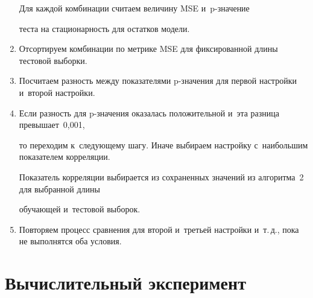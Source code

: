 \begin{multicols}{2}
\begin{enumerate}[1.]
        Для каждой комбинации считаем величину MSE и~p-зна\-че\-ние 

        теста на ста\-ци\-о\-нар\-ность для остатков модели.



        

        

        \item



        Отсортируем комбинации по метрике MSE для фиксированной длины тес\-то\-вой выборки.



        \item



        Посчитаем разность между показателями \mbox{p-зна}\-че\-ния для первой настройки и~второй настройки.



        

        \item



        Если разность для p-зна\-че\-ния оказалась положительной и~эта разница превышает~0,001, 

        то переходим к~следующему шагу. Иначе выбираем настройку с~наибольшим показателем корреляции. 

        Показатель корреляции выбирается из сохраненных значений из алгоритма~2 для выбранной длины 

        обуча\-ющей и~тес\-то\-вой выборок.



        

        \item



        Повторяем процесс сравнения для второй и~треть\-ей настройки и~т.\,д., пока не выполнятся оба условия.



        

        

    \end{enumerate}









\section{Вычислительный эксперимент}




\end{multicols}
